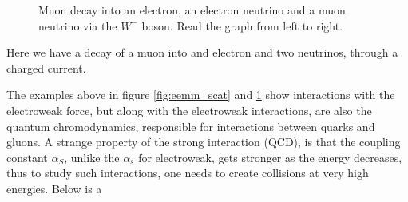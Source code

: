 \begin{figure}[h!]
    \centering
    \caption{Muon decay into an electron, an electron neutrino and a muon neutrino via the $W^{-}$ boson. Read the graph from left to right.}
    
    \label{fig:mw_decay}
\end{figure}

Here we have a decay of a muon into and electron and two neutrinos, through a charged current. \par 
The examples above in figure \ref{fig:eemm_scat} and \ref{fig:mw_decay} show interactions with 
the electroweak force, but along with the electroweak interactions, are also the quantum chromodynamics, 
responsible for interactions between quarks and gluons. A strange property of the strong interaction (QCD),
is that the coupling constant $\alpha_S$, unlike the $\alpha_s$ for electroweak,
gets stronger as the energy decreases, thus to study such interactions, one needs to create collisions 
at very high energies. Below is a 


